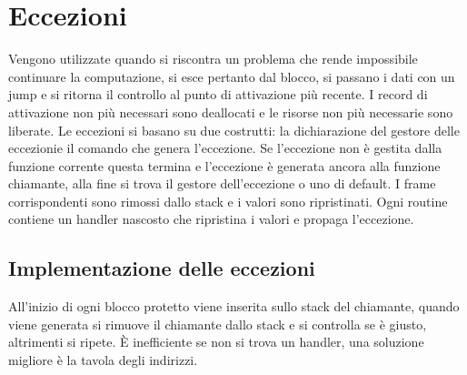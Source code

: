 \section{Eccezioni}
Vengono utilizzate quando si riscontra un problema che rende impossibile continuare la computazione, si esce pertanto dal blocco, si passano i dati con un jump e si ritorna
il controllo al punto di attivazione pi\`u recente. I record di attivazione non pi\`u necessari sono deallocati e le risorse non pi\`u necessarie sono liberate. Le eccezioni 
si basano su due costrutti: la dichiarazione del gestore delle eccezionie il comando che genera l'eccezione. Se l'eccezione non \`e gestita dalla funzione corrente questa 
termina e l'eccezione \`e generata ancora alla funzione chiamante, alla fine si trova il gestore dell'eccezione o uno di default. I frame corrispondenti sono rimossi dallo stack 
e i valori sono ripristinati. Ogni routine contiene un handler nascosto che ripristina i valori e propaga l'eccezione. 
\subsection{Implementazione delle eccezioni}
All'inizio di ogni blocco protetto viene inserita sullo stack del chiamante, quando viene generata si rimuove il chiamante dallo stack e si controlla se \`e giusto, altrimenti
si ripete. \`E inefficiente se non si trova un handler, una soluzione migliore \`e la tavola degli indirizzi. 
